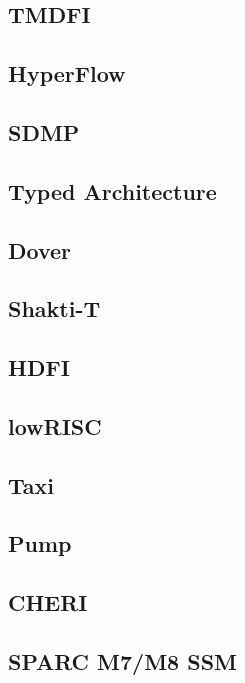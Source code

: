 \subsection{TMDFI}


\subsection{HyperFlow} 

\subsection{SDMP}

\subsection{Typed Architecture}

\subsection{Dover}

\subsection{Shakti-T}

\subsection{HDFI}

\subsection{lowRISC}

\subsection{Taxi}

\subsection{Pump}

\subsection{CHERI}

\subsection{SPARC M7/M8 SSM}

